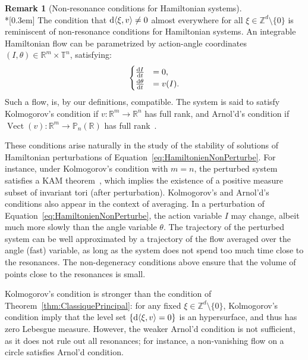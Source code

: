 \documentclass[10pt]{amsart}
\theoremstyle{definition}\newtheorem{defi}[theo]{Definition}\newtheorem{rema}[theo]{Remark}\newtheorem{exam}[theo]{Example}\newtheorem{exem}[theo]{Example}\newtheorem{nota}[theo]{Notation}
\DeclareMathOperator{\Vect}{Vect}
\newcommand{\Z}{\mathbb{Z}}
\newcommand{\R}{\mathbb{R}}
\newcommand{\Pbb}{\mathbb{P}}
\newcommand{\Tbb}{\mathbb{T}}
\newcommand{\de}{{\rm d}}
\begin{document}
\pagebreak
\begin{rema}[Non-resonance conditions for Hamiltonian systems] \ \\*[0.3em]
The condition that $\de \langle \xi, v \rangle \neq 0$ almost everywhere for all $\xi \in \Z^d \setminus \{0\}$ is reminiscent of non-resonance conditions for Hamiltonian systems. An integrable Hamiltonian flow can be parametrized by action-angle coordinates $(I, \theta) \in \R^m \times \Tbb^n$, satisfying:
\begin{equation}\label{eq:HamiltonienNonPerturbe}
\begin{cases}
\frac{\de I}{\de t} & = 0, \\
\frac{\de \theta}{\de t} & = v(I).
\end{cases}
\end{equation}
Such a flow, is, by our definitions, compatible. The system is said to satisfy Kolmogorov's condition if $v : \R^m \to \R^n$ has full rank, and Arnol'd's condition if $\Vect(v) : \R^m \to \Pbb_n (\R)$ has full rank~\cite[Chapter~6.4]{LochakMeunier:1988}.


These conditions arise naturally in the study of the stability of solutions of Hamiltonian perturbations of Equation~\eqref{eq:HamiltonienNonPerturbe}. For instance, under Kolmogorov's condition with $m=n$, the perturbed system satisfies a KAM theorem~\cite{Kolmogorov:1954}, which implies the existence of a positive measure subset of invariant tori (after perturbation). Kolmogorov's and Arnol'd's conditions also appear in the context of averaging. In a perturbation of Equation~\eqref{eq:HamiltonienNonPerturbe}, the action variable $I$ may change, albeit much more slowly than the angle variable $\theta$. The trajectory of the perturbed system can be well approximated by a trajectory of the flow averaged over the angle (fast) variable, as long as the system does not spend too much time close to the resonances. The non-degeneracy conditions above ensure that the volume of points close to the resonances is small.


Kolmogorov's condition is stronger than the condition of Theorem~\ref{thm:ClassiquePrincipal}: for any fixed $\xi \in \Z^d \setminus \{0\}$, Kolmogorov's condition imply that the level set $\{\de \langle \xi, v \rangle = 0\}$ is an hypersurface, and thus has zero Lebesgue measure. However, the weaker Arnol'd condition is not sufficient, as it does not rule out all resonances; for instance, a non-vanishing flow on a circle satisfies Arnol'd condition.
\end{rema}
\end{document}
